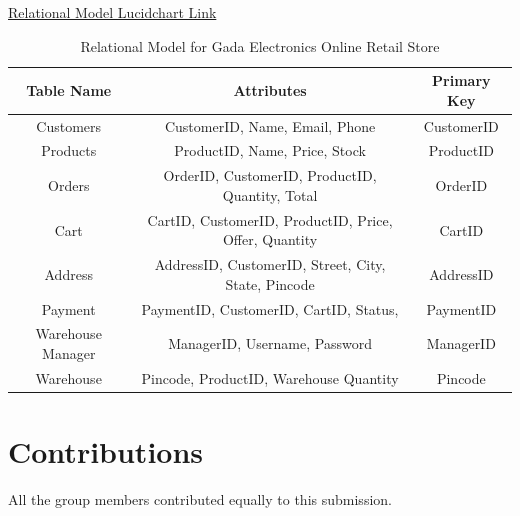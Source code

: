 \documentclass[12pt]{article}
\begin{document}
\begin{enumerate}
    \href{https://lucid.app/lucidchart/f0f83a9c-e4e7-40b4-8084-4aa469b2c117/edit?viewport_loc=-2090%2C-1218%2C3787%2C1837%2C2r69nEUlK38n&invitationId=inv_fe50a5de-ddfc-41c6-aecb-986d3631892c}{Relational Model Lucidchart Link}
\end{enumerate}

\begin{table}[h]
    \centering
    \begin{tabular}{|c|c|c|}
        \hline
        \textbf{Table Name} & \textbf{Attributes} & \textbf{Primary Key} \\
        \hline
        Customers & CustomerID, Name, Email, Phone & CustomerID \\
        \hline
        Products & ProductID, Name, Price, Stock & ProductID \\
        \hline
        Orders & OrderID, CustomerID, ProductID, Quantity, Total & OrderID \\
        \hline
        Cart & CartID, CustomerID, ProductID, Price, Offer, Quantity & CartID \\
        \hline
        Address & AddressID, CustomerID, Street, City, State, Pincode & AddressID \\
        \hline
        Payment & PaymentID, CustomerID, CartID, Status, & PaymentID \\
        \hline
        Warehouse Manager & ManagerID, Username, Password & ManagerID \\
        \hline
        Warehouse & Pincode, ProductID, Warehouse Quantity & Pincode\\
        \hline
    \end{tabular}
    \caption{Relational Model for Gada Electronics Online Retail Store}
    \label{tab:relational_model}
\end{table}

\section*{Contributions}
All the group members contributed equally to this submission.
\end{document}
